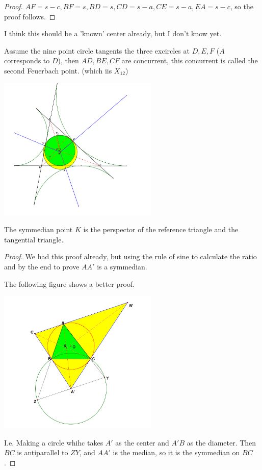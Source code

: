 \begin{proof}
$AF=s-c, BF=s, BD=s, CD=s-a, CE=s-a, EA=s-c$, so the proof follows.
\end{proof}

I think this should be a 'known' center already, but I don't know yet.

\begin{theorem}
Assume the nine point circle tangents the three excircles at $D, E,F$ ($A$ corresponds to $D$), then
$AD, BE, CF$ are concurrent, this concurrent is called the second Feuerbach point. (which iis $X_{12}$)


\includegraphics[width=3in]{excircle2.png}
\end{theorem}

\begin{theorem}
The symmedian point $K$ is the perspector of the reference triangle and the tangential triangle.
\end{theorem}

\begin{proof}
We had this proof already, but using the rule of sine to calculate the ratio and by the end to prove $AA'$ is a symmedian.

The following figure shows a better proof.


\includegraphics[width=3in]{tangentialcircle1.png}

I.e. Making a circle whihc takes $A'$ as the center and $A'B$ as the diameter. Then $BC$ is antiparallel to $ZY$, and
$AA'$ is the median, so it is the symmedian on $BC$.
\end{proof}

